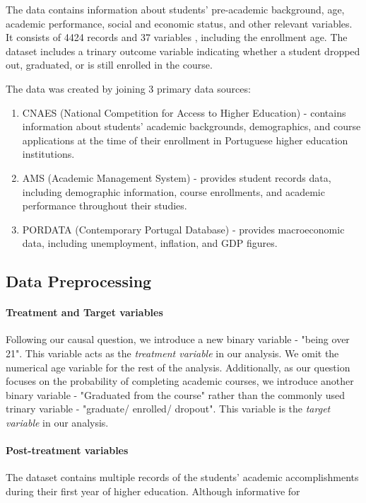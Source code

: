 \documentclass[11pt]{article}
\newcommand{\todo}[1]{{\color{orange}{TODO: #1}}}
\begin{document}
The data contains information about students' pre-academic background, age, academic performance, social and economic status, and other relevant variables. It consists of 4424 records and 37 variables \todo{number of categorical and numerical}, including the enrollment age. The dataset includes a trinary outcome variable indicating whether a student dropped out, graduated, or is still enrolled in the course. 

The data was created by joining 3 primary data sources: 
\begin{enumerate}
    \item CNAES (National Competition for Access to Higher Education) - contains information about students' academic backgrounds, demographics, and course applications at the time of their enrollment in Portuguese higher education institutions.
    \item AMS (Academic Management System) - provides student records data, including demographic information, course enrollments, and academic performance throughout their studies.
    \item PORDATA (Contemporary Portugal Database) - provides macroeconomic data, including unemployment, inflation, and GDP figures.
\end{enumerate}


\todo{Figure star of treatment and target distributions, discussion.}

\todo{Age limitation in Portugal.}

\subsection{Data Preprocessing}

\paragraph{Treatment and Target variables} Following our causal question, we introduce a new binary variable - "being over 21". This variable acts as the \emph{treatment variable} in our analysis. We omit the numerical age variable for the rest of the analysis. Additionally, as our question focuses on the probability of completing academic courses, we introduce another binary variable - "Graduated from the course" rather than the commonly used trinary variable - "graduate/  enrolled/ dropout". This variable is the \emph{target variable} in our analysis.

\paragraph{Post-treatment variables} The dataset contains multiple records of the students' academic accomplishments during their first year of higher education. Although informative for 
\end{document}
